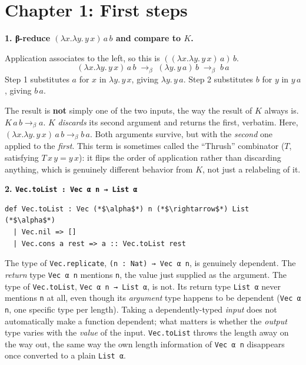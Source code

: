 \section{Chapter 1: First steps}\label{sec:14-appendix-solutions:01-chapter-1:1}

\textbf{1. β-reduce \((\lambda x.\lambda y.\, y\, x)\, a\, b\) and compare to \(K\).}

Application associates to the left, so this is \(((\lambda x.\lambda y.\, y\, x)\, a)\, b\). \[
(\lambda x.\lambda y.\, y\, x)\, a\, b
\;\longrightarrow_\beta\; (\lambda y.\, y\, a)\, b
\;\longrightarrow_\beta\; b\, a
\] Step 1 substitutes \(a\) for \(x\) in \(\lambda y.\, y\, x\), giving \(\lambda y.\, y\, a\). Step 2 substitutes \(b\) for \(y\) in \(y\, a\), giving \(b\, a\).

The result is \textbf{not} simply one of the two inputs, the way the result of \(K\) always is. \(K\,a\,b \to_\beta a\). \(K\) \emph{discards} its second argument and returns the first, verbatim. Here, \((\lambda x.\lambda y.\, y\, x)\, a\, b \to_\beta b\, a\). Both arguments survive, but with the \emph{second} one applied to the \emph{first}. This term is sometimes called the ``Thrush'' combinator (\(T\), satisfying \(T\, x\, y = y\, x\)): it flips the order of application rather than discarding anything, which is genuinely different behavior from \(K\), not just a relabeling of it.

\textbf{2. \texttt{Vec.toList : Vec α n → List α}}

\begin{lstlisting}
def Vec.toList : Vec (*$\alpha$*) n (*$\rightarrow$*) List (*$\alpha$*)
  | Vec.nil => []
  | Vec.cons a rest => a :: Vec.toList rest
\end{lstlisting}

The type of \texttt{Vec.replicate}, \texttt{(n : Nat) → Vec α n}, is genuinely dependent. The \emph{return} type \texttt{Vec α n} mentions \texttt{n}, the value just supplied as the argument. The type of \texttt{Vec.toList}, \texttt{Vec α n → List α}, is not. Its return type \texttt{List α} never mentions \texttt{n} at all, even though its \emph{argument} type happens to be dependent (\texttt{Vec α n}, one specific type per length). Taking a dependently-typed \emph{input} does not automatically make a function dependent; what matters is whether the \emph{output} type varies with the \emph{value} of the input. \texttt{Vec.toList} throws the length away on the way out, the same way the own length information of \texttt{Vec α n} disappears once converted to a plain \texttt{List α}.

